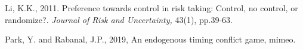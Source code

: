 \documentclass[12pt, letterpaper]{article}
\theoremstyle{plain}
\begin{document}
\begin{thebibliography}{10}
\bibitem{} Li, K.K., 2011. Preference towards control in risk taking: Control, no control, or randomize?. \textit{Journal of Risk and Uncertainty,} 43(1), pp.39-63.










\bibitem{} Park, Y. and Rabanal, J.P., 2019, An endogenous timing conflict game, mimeo. 




\end{thebibliography}
\end{document}
